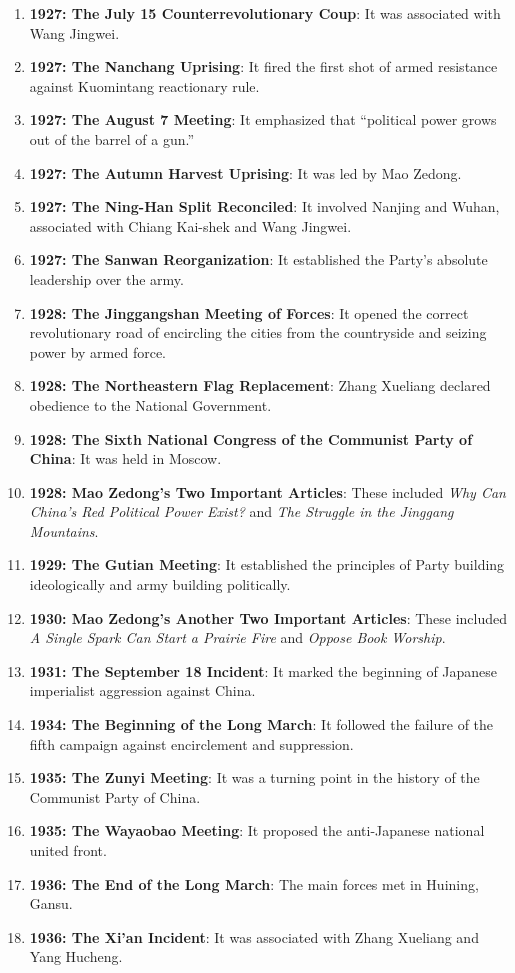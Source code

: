\documentclass[12pt,a4paper]{ctexart}
\begin{document}
\begin{enumerate}[leftmargin=2em]
    \item \textbf{1927: The July 15 Counterrevolutionary Coup}: It was associated with Wang Jingwei.
    \item \textbf{1927: The Nanchang Uprising}: It fired the first shot of armed resistance against Kuomintang reactionary rule.
    \item \textbf{1927: The August 7 Meeting}: It emphasized that ``political power grows out of the barrel of a gun.''
    \item \textbf{1927: The Autumn Harvest Uprising}: It was led by Mao Zedong.
    \item \textbf{1927: The Ning-Han Split Reconciled}: It involved Nanjing and Wuhan, associated with Chiang Kai-shek and Wang Jingwei.
    \item \textbf{1927: The Sanwan Reorganization}: It established the Party's absolute leadership over the army.
    \item \textbf{1928: The Jinggangshan Meeting of Forces}: It opened the correct revolutionary road of encircling the cities from the countryside and seizing power by armed force.
    \item \textbf{1928: The Northeastern Flag Replacement}: Zhang Xueliang declared obedience to the National Government.
    \item \textbf{1928: The Sixth National Congress of the Communist Party of China}: It was held in Moscow.
    \item \textbf{1928: Mao Zedong's Two Important Articles}: These included \textit{Why Can China's Red Political Power Exist?} and \textit{The Struggle in the Jinggang Mountains}.
    \item \textbf{1929: The Gutian Meeting}: It established the principles of Party building ideologically and army building politically.
    \item \textbf{1930: Mao Zedong's Another Two Important Articles}: These included \textit{A Single Spark Can Start a Prairie Fire} and \textit{Oppose Book Worship}.
    \item \textbf{1931: The September 18 Incident}: It marked the beginning of Japanese imperialist aggression against China.
    \item \textbf{1934: The Beginning of the Long March}: It followed the failure of the fifth campaign against encirclement and suppression.
    \item \textbf{1935: The Zunyi Meeting}: It was a turning point in the history of the Communist Party of China.
    \item \textbf{1935: The Wayaobao Meeting}: It proposed the anti-Japanese national united front.
    \item \textbf{1936: The End of the Long March}: The main forces met in Huining, Gansu.
    \item \textbf{1936: The Xi'an Incident}: It was associated with Zhang Xueliang and Yang Hucheng.
\end{enumerate}
\end{document}
